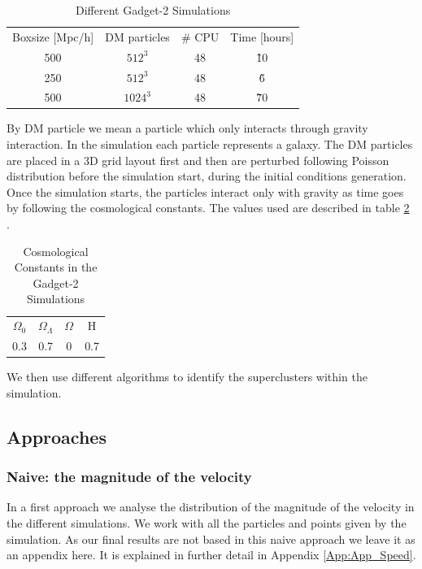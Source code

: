 \documentclass[12pt]{article}
\begin{document}
\begin{table}[ht]
    \centering
    \begin{tabular}{|c|c|c|c|}
        Boxsize [Mpc/h] & DM particles & \# CPU & Time [hours] \\
        500 & $512^{3}$ & 48 & \~ 10 \\
        250 & $512^{3}$ & 48 & \~ 6  \\
        500 & $1024^{3}$ & 48 & \~ 70  \\
    \end{tabular}
    \caption{Different Gadget-2 Simulations}
    \label{tab:sims}
\end{table}
\FloatBarrier

By DM particle we mean a particle which only
 interacts through gravity
interaction. In the simulation each particle
 represents a galaxy. The DM particles are
placed in a 3D grid layout first and then are
 perturbed following Poisson distribution
before the simulation start, during the initial
 conditions generation.\\

Once the simulation starts, the particles interact
 only with gravity as time goes by following the
  cosmological constants. The values used are
   described in table \ref{tab:consts}\\.
  
 \begin{table}[ht]
    \centering
    \begin{tabular}{|c|c|c|c|}
        $\Omega_0$ & $\Omega_{\Lambda}$ & $\Omega $ & H \\
        0.3 &  0.7 & 0 & 0.7 \\
    \end{tabular}
    \caption{Cosmological Constants in the Gadget-2 Simulations}
    \label{tab:consts}
\end{table}
\FloatBarrier

We then use different algorithms to identify the
 superclusters within the simulation.\\

\subsection{Approaches}

\subsubsection{Naive: the magnitude of the velocity}
\label{sec:naive_speed}
\begin{par}
In a first approach we analyse the distribution of
 the magnitude of the velocity in the different
  simulations. We work with all the particles and
   points given by the simulation. As our final
    results are not based in this naive approach
     we leave it as an appendix here. It is
      explained in further detail in Appendix
       \ref{App:App_Speed}.
\end{par}
\end{document}
